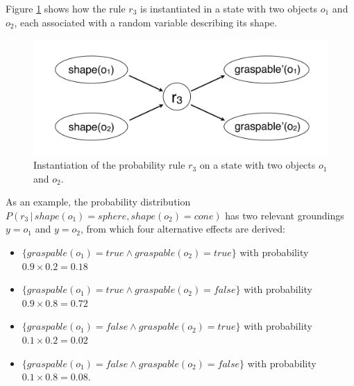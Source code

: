 

Figure \ref{fig:quantinstantitionprob} shows how the rule $r_3$ is instantiated in a state with two objects $o_1$ and $o_2$, each associated with a random variable describing its shape.

\begin{figure}[h]
\centering
\includegraphics[scale=0.25]{imgs/quantruleinstantiation.pdf}
\caption{Instantiation of the probability rule $r_3$ on a state with two objects $o_1$ and $o_2$.}
\label{fig:quantinstantitionprob}
\end{figure}

As an example, the probability distribution $P(r_3 \, | \, \mathit{shape}(o_1)\!=\!\mathit{sphere}, \mathit{shape}(o_2)\!=\!\mathit{cone})$ has two relevant groundings $y\!=\!o_1$ and $y\!=\!o_2$, from which four alternative effects are derived: \begin{itemize}
\item $\{\mathit{graspable}(o_1)\!=\!true \land \mathit{graspable}(o_2)\!=\!true \} $ with probability $0.9 \times 0.2 = 0.18$ 
\item $\{\mathit{graspable}(o_1)\!=\!true \land \mathit{graspable}(o_2)\!=\!false\}$ with probability $0.9 \times 0.8 = 0.72$ 
\item $\{\mathit{graspable}(o_1)\!=\!false \land \mathit{graspable}(o_2)\!=\!true \}$ with probability $0.1 \times 0.2 = 0.02$ 
\item $\{\mathit{graspable}(o_1)\!=\!false \land \mathit{graspable}(o_2)\!=\!false\}$ with probability $0.1 \times 0.8 = 0.08$. 
\end{itemize} 


